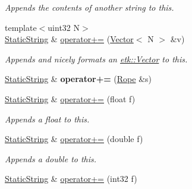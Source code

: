 \begin{DoxyCompactItemize}
\begin{DoxyCompactList}\small\item\em Appends the contents of another string to this. \end{DoxyCompactList}\item 
\hypertarget{classetk_1_1_static_string_a5652d2ae09bac5f0f7dacb5d198f126d}{{\footnotesize template$<$uint32 N$>$ }\\\hyperlink{classetk_1_1_static_string}{Static\-String} \& \hyperlink{classetk_1_1_static_string_a5652d2ae09bac5f0f7dacb5d198f126d}{operator+=} (\hyperlink{classetk_1_1_vector}{Vector}$<$ N $>$ \&v)}\label{classetk_1_1_static_string_a5652d2ae09bac5f0f7dacb5d198f126d}

\begin{DoxyCompactList}\small\item\em Appends and nicely formats an \hyperlink{classetk_1_1_vector}{etk\-::\-Vector} to this. \end{DoxyCompactList}\item 
\hypertarget{classetk_1_1_static_string_a4989ff63067111d9febd227619417c2d}{\hyperlink{classetk_1_1_static_string}{Static\-String} \& {\bfseries operator+=} (\hyperlink{classetk_1_1_rope}{Rope} \&s)}\label{classetk_1_1_static_string_a4989ff63067111d9febd227619417c2d}

\item 
\hypertarget{classetk_1_1_static_string_af554e70798b8deee951fa22d3b73c08f}{\hyperlink{classetk_1_1_static_string}{Static\-String} \& \hyperlink{classetk_1_1_static_string_af554e70798b8deee951fa22d3b73c08f}{operator+=} (float f)}\label{classetk_1_1_static_string_af554e70798b8deee951fa22d3b73c08f}

\begin{DoxyCompactList}\small\item\em Appends a float to this. \end{DoxyCompactList}\item 
\hypertarget{classetk_1_1_static_string_aa40e2bed504c072623e6a656b3dc2cf8}{\hyperlink{classetk_1_1_static_string}{Static\-String} \& \hyperlink{classetk_1_1_static_string_aa40e2bed504c072623e6a656b3dc2cf8}{operator+=} (double f)}\label{classetk_1_1_static_string_aa40e2bed504c072623e6a656b3dc2cf8}

\begin{DoxyCompactList}\small\item\em Appends a double to this. \end{DoxyCompactList}\item 
\hypertarget{classetk_1_1_static_string_a4766b095db2cd11e90d7f9615e5a88e9}{\hyperlink{classetk_1_1_static_string}{Static\-String} \& \hyperlink{classetk_1_1_static_string_a4766b095db2cd11e90d7f9615e5a88e9}{operator+=} (int32 f)}\label{classetk_1_1_static_string_a4766b095db2cd11e90d7f9615e5a88e9}


\end{DoxyCompactItemize}
